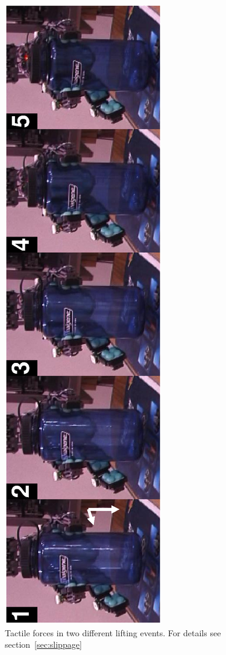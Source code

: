 \begin{figure}[htbp]
\centerline{
\includegraphics[height=\columnwidth, angle=270
]{./figures/Slippage.eps}} \caption[Tactile forces when lifting an
object]{Tactile forces in two different lifting events. For
details see section~\ref{sec:slippage} } \label{fig:slip}
\end{figure}



%
%

